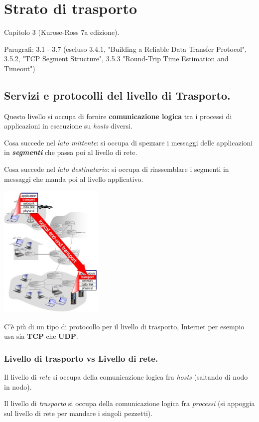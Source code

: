 \documentclass[10pt, a4paper, openany]{book}
\begin{document}
\chapter{Strato di trasporto}
Capitolo 3 (Kurose-Ross 7a edizione).

\noindent Paragrafi: 3.1 - 3.7 (escluso 3.4.1, "Building a Reliable Data Transfer Protocol", 3.5.2, "TCP Segment Structure", 3.5.3 "Round-Trip Time Estimation and Timeout")

\section{Servizi e protocolli del livello di Trasporto.}
\noindent Questo livello si occupa di fornire \textbf{comunicazione logica} tra i processi di applicazioni in esecuzione su \textit{hosts} diversi.

\noindent Cosa succede nel \textit{lato mittente}: si occupa di spezzare i messaggi delle applicazioni in \textbf{\textit{segmenti}} che passa poi al livello di rete.

\noindent Cosa succede nel \textit{lato destinatario}: si occupa di riassemblare i segmenti in messaggi che manda poi al livello applicativo.
\begin{center}
    \includegraphics[width=50mm]{cap2 - Livello di Trasporto - 1.jpg}
\end{center}
\noindent C'è più di un tipo di protocollo per il livello di trasporto, Internet per esempio usa sia \textbf{TCP} che \textbf{UDP}.

\subsection{Livello di trasporto vs Livello di rete.}
\noindent Il livello di \textit{rete} si occupa della comunicazione logica fra \textit{hosts} (saltando di nodo in nodo).

\noindent Il livello di \textit{trasporto} si occupa della comunicazione logica fra \textit{processi} (si appoggia sul livello di rete per mandare i singoli pezzetti).
\end{document}
